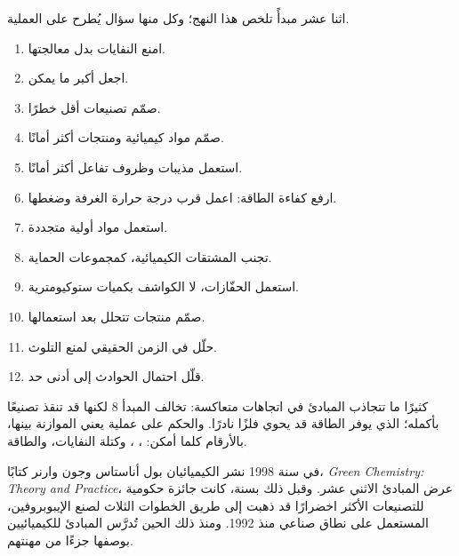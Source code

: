 اثنا عشر مبدأً تلخص هذا النهج؛ وكل منها سؤال يُطرح على
العملية.
\begin{enumerate}
  \item امنع النفايات بدل معالجتها.
  \item اجعل  أكبر ما يمكن.
  \item صمّم تصنيعات أقل خطرًا.
  \item صمّم مواد كيميائية ومنتجات أكثر أمانًا.
  \item استعمل مذيبات وظروف تفاعل أكثر أمانًا.
  \item ارفع كفاءة الطاقة: اعمل قرب درجة حرارة الغرفة
        وضغطها.
  \item استعمل مواد أولية متجددة.
  \item تجنب المشتقات الكيميائية، كمجموعات الحماية.
  \item استعمل الحفّازات، لا الكواشف بكميات ستوكيومترية.
  \item صمّم منتجات تتحلل بعد استعمالها.
  \item حلّل في الزمن الحقيقي لمنع التلوث.
  \item قلّل احتمال الحوادث إلى أدنى حد.
\end{enumerate}

\begin{remark}\label{rem:g12:synthesis-strategy:principles}
كثيرًا ما تتجاذب المبادئ في اتجاهات متعاكسة: 
تخالف المبدأ 8 لكنها قد تنقذ تصنيعًا بأكمله؛  الذي يوفر
الطاقة قد يحوي فلزًا نادرًا. والحكم على عملية يعني الموازنة بينها،
بالأرقام كلما أمكن: ، ، وكتلة النفايات،
والطاقة.
\end{remark}

\begin{history}
في سنة 1998 نشر الكيميائيان بول أناستاس وجون وارنر كتابًا،
\emph{Green Chemistry: Theory and Practice}، عرض المبادئ الاثني عشر.
وقبل ذلك بسنة، كانت جائزة حكومية للتصنيعات الأكثر اخضرارًا قد
ذهبت إلى طريق الخطوات الثلاث لصنع الإيبوبروفين، المستعمل على نطاق صناعي
منذ 1992. ومنذ ذلك الحين تُدرَّس المبادئ للكيميائيين بوصفها
جزءًا من مهنتهم.
\end{history}

